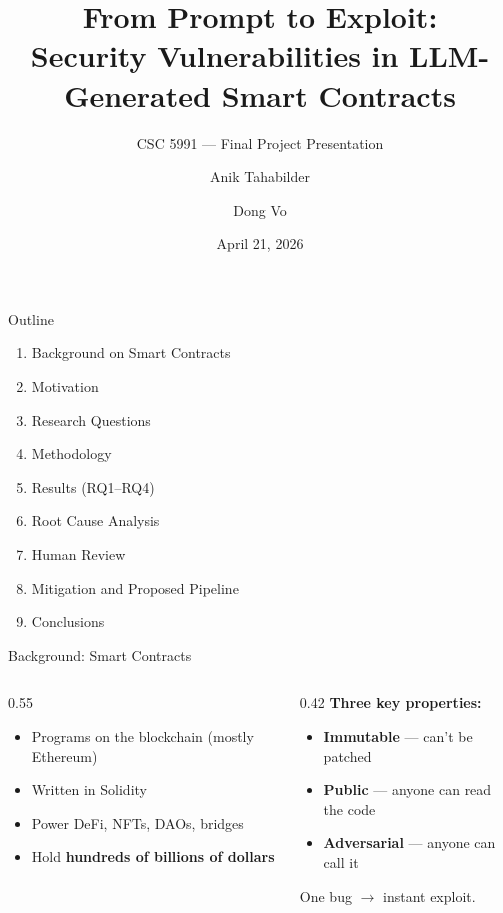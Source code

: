 \documentclass[aspectratio=169]{beamer}
\title[LLM Smart Contract Security]{From Prompt to Exploit:\\Security Vulnerabilities in LLM-Generated Smart Contracts}
\subtitle{CSC 5991 --- Final Project Presentation}
\author{Anik Tahabilder \and Dong Vo}
\institute{Wayne State University}
\date{April 21, 2026}
\begin{document}
\begin{frame}
\titlepage
\end{frame}

\begin{frame}{Outline}
\begin{enumerate}
    \item Background on Smart Contracts
    \item Motivation
    \item Research Questions
    \item Methodology
    \item Results (RQ1--RQ4)
    \item Root Cause Analysis
    \item Human Review
    \item Mitigation and Proposed Pipeline
    \item Conclusions
\end{enumerate}
\end{frame}

\begin{frame}{Background: Smart Contracts}
\begin{columns}
\begin{column}{0.55\textwidth}
\begin{itemize}
    \item Programs on the blockchain (mostly Ethereum)
    \item Written in Solidity
    \item Power DeFi, NFTs, DAOs, bridges
    \item Hold \textbf{hundreds of billions of dollars}
\end{itemize}
\end{column}
\begin{column}{0.42\textwidth}
\textbf{Three key properties:}
\begin{itemize}
    \item \textbf{Immutable} --- can't be patched
    \item \textbf{Public} --- anyone can read the code
    \item \textbf{Adversarial} --- anyone can call it
\end{itemize}

\vspace{0.25cm}
\begin{block}{}
\centering One bug $\to$ instant exploit.
\end{block}
\end{column}
\end{columns}
\end{frame}
\end{document}
